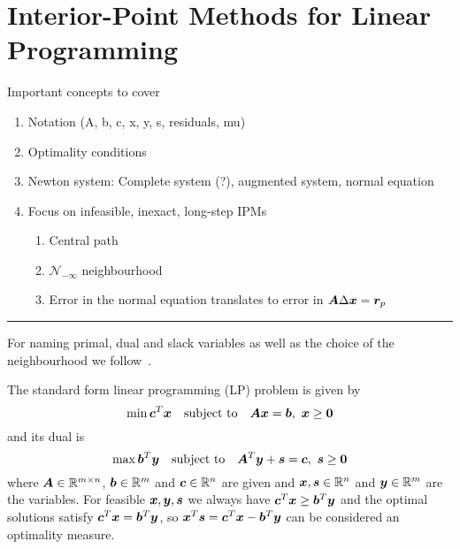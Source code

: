 \chapter{Interior-Point Methods for Linear Programming}\label{chap:ipm}

Important concepts to cover
\begin{enumerate}
 \item Notation (A, b, c, x, y, s, residuals, mu)
 \item Optimality conditions
 \item Newton system: Complete system (?), augmented system, normal equation
 \item Focus on infeasible, inexact, long-step IPMs
 \begin{enumerate}
   \item Central path
   \item \(\mathcal{N}_{-\infty}\) neighbourhood
   \item Error in the normal equation translates to error in \(\bm{A}\Delta\bm{x} = \bm{r}_p\)
 \end{enumerate}
\end{enumerate}

\hrule

For naming primal, dual and slack variables as well as the choice of the neighbourhood we follow~\cite{Monteiro-ConvergenceAnalysisLongStepInfeasibleIPMs}.

The standard form linear programming (LP) problem is given by
\begin{equation}
 \min \bm{c}^T \bm{x} \quad \text{subject to} \quad \bm{A}\bm{x} = \bm{b}, \ \bm{x} \geq \bm{0}
\end{equation}
and its dual is
\begin{equation}
  \max \bm{b}^T \bm{y} \quad \text{subject to} \quad \bm{A}^T \bm{y} + \bm{s} = \bm{c}, \ \bm{s} \geq \bm{0}
\end{equation}
where \(\bm{A} \in \mathbb{R}^{m \times n}\), \(\bm{b} \in \mathbb{R}^m\) and \(\bm{c} \in \mathbb{R}^n\) are given and \(\bm{x}, \bm{s} \in \mathbb{R}^n\) and \(\bm{y} \in \mathbb{R}^m\) are the variables.
For feasible \(\bm{x}, \bm{y}, \bm{s}\) we always have \(\bm{c}^T \bm{x} \geq \bm{b}^T \bm{y}\) and the optimal solutions satisfy \(\bm{c}^T \bm{x} = \bm{b}^T \bm{y}\), so \(\bm{x}^T \bm{s} = \bm{c}^T \bm{x} - \bm{b}^T \bm{y}\) can be considered an optimality measure.

